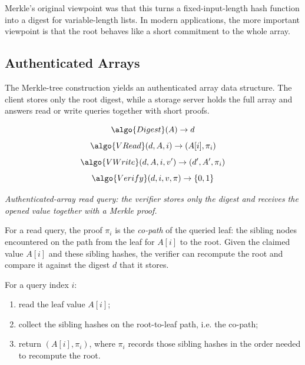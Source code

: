 \documentclass[11pt]{article}
\newcommand{\Digest}{\algo{Digest}}
\newcommand{\VRead}{\algo{VRead}}
\newcommand{\VWrite}{\algo{VWrite}}
\newcommand{\VerifyAA}{\algo{Verify}}
\begin{document}
Merkle's original viewpoint was that this turns a fixed-input-length hash
function into a digest for variable-length lists.  In modern applications, the
more important viewpoint is that the root behaves like a short commitment to
the whole array.

\subsection{Authenticated Arrays}

The Merkle-tree construction yields an authenticated array data structure.
The client stores only the root digest, while a storage server holds the full
array and answers read or write queries together with short proofs.

\begin{highlight}[title={Authenticated-Array Interface}]
\[
  \Digest(A) \to d
\]
\[
  \VRead(d, A, i) \to (A[i], \pi_i)
\]
\[
  \VWrite(d, A, i, v') \to (d', A', \pi_i)
\]
\[
  \VerifyAA(d, i, v, \pi) \to \{0,1\}
\]
\end{highlight}

\begin{center}

\smallskip
\emph{Authenticated-array read query: the verifier stores only the digest and
receives the opened value together with a Merkle proof.}
\end{center}

For a read query, the proof $\pi_i$ is the \emph{co-path} of the queried leaf:
the sibling nodes encountered on the path from the leaf for $A[i]$ to the
root.  Given the claimed value $A[i]$ and these sibling hashes, the verifier
can recompute the root and compare it against the digest $d$ that it stores.

\begin{graybox}[title={Computing a Merkle Read Proof}]
For a query index $i$:
\begin{enumerate}
  \item read the leaf value $A[i]$;
  \item collect the sibling hashes on the root-to-leaf path, i.e. the co-path;
  \item return $(A[i],\pi_i)$, where $\pi_i$ records those sibling hashes in
        the order needed to recompute the root.
\end{enumerate}
\end{graybox}
\end{document}
